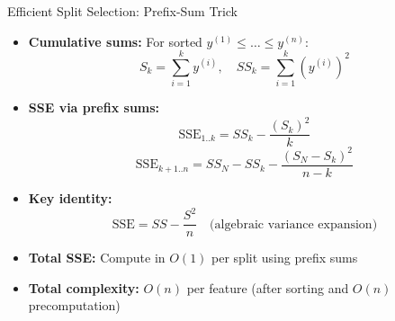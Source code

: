 \documentclass[11pt,compress,t,notes=noshow, aspectratio=169, xcolor=table]{beamer}
\begin{document}
\begin{frame}{Efficient Split Selection: Prefix-Sum Trick}
  \begin{itemize}
    \item \textbf{Cumulative sums:} For sorted $y^{(1)} \leq \dots \leq y^{(n)}$:
    \[ S_k = \sum_{i=1}^k y^{(i)}, \quad SS_k = \sum_{i=1}^k (y^{(i)})^2 \]
    \item \textbf{SSE via prefix sums:}
    \[ \text{SSE}_{1..k} = SS_k - \frac{(S_k)^2}{k} \]
    \[ \text{SSE}_{k+1..n} = SS_N - SS_k - \frac{(S_N - S_k)^2}{n-k} \]
    \item \textbf{Key identity:} \[ \text{SSE} = SS - \frac{S^2}{n} \quad \text{(algebraic variance expansion)} \]
    \item \textbf{Total SSE:} Compute in $O(1)$ per split using prefix sums
    \item \textbf{Total complexity:} $O(n)$ per feature (after sorting and $O(n)$ precomputation)
  \end{itemize}
\end{frame}
\end{document}
